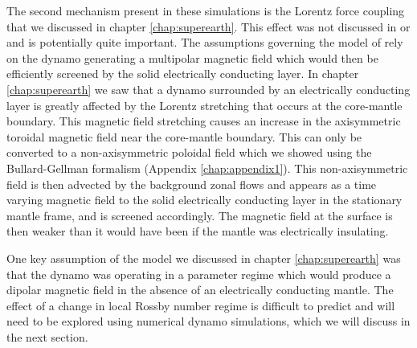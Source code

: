 The second mechanism present in these simulations is the Lorentz force coupling that we discussed in chapter \ref{chap:superearth}. This effect was not discussed in \citet{smith2012} or \citet{hauck2013} and is potentially quite important.  The assumptions governing the model of \citet{smith2012} rely on the dynamo generating a multipolar magnetic field which would then be efficiently screened by the solid electrically conducting layer. In chapter \ref{chap:superearth} we saw that a dynamo surrounded by an electrically conducting layer is greatly affected by the Lorentz stretching that occurs at the core-mantle boundary. This magnetic field stretching causes an increase in the axisymmetric toroidal magnetic field near the core-mantle boundary. This can only be converted to a non-axisymmetric poloidal field which we showed using the Bullard-Gellman formalism (Appendix \ref{chap:appendix1}). This non-axisymmetric field is then advected by the background zonal flows and appears as a time varying magnetic field to the solid electrically conducting layer in the stationary mantle frame, and is screened accordingly. The magnetic field at the surface is then weaker than it would have been if the mantle was electrically insulating.

One key assumption of the model we discussed in chapter \ref{chap:superearth} was that the dynamo was operating in a parameter regime which would produce a dipolar magnetic field in the absence of an electrically conducting mantle. The effect of a change in local Rossby number regime is difficult to predict and will need to be explored using numerical dynamo simulations, which we will discuss in the next section.

